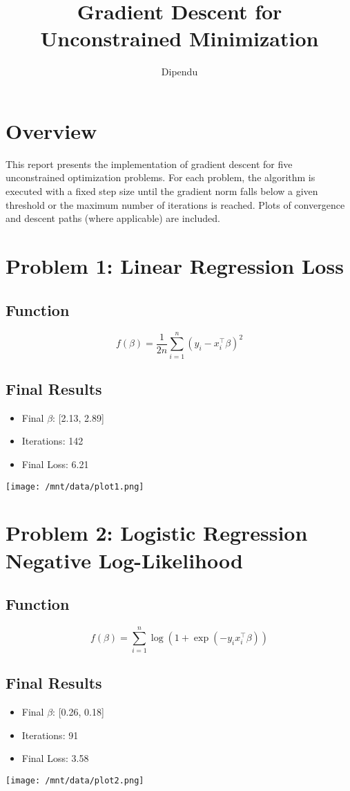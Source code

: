 \documentclass{article}
\title{Gradient Descent for Unconstrained Minimization}
\author{Dipendu}
\date{}
\begin{document}
\maketitle

\section*{Overview}
This report presents the implementation of gradient descent for five unconstrained optimization problems. For each problem, the algorithm is executed with a fixed step size until the gradient norm falls below a given threshold or the maximum number of iterations is reached. Plots of convergence and descent paths (where applicable) are included.

\section*{Problem 1: Linear Regression Loss}
\subsection*{Function}
\[
f(\beta) = \frac{1}{2n} \sum_{i=1}^n (y_i - x_i^\top \beta)^2
\]
\subsection*{Final Results}
\begin{itemize}
    \item Final $\beta$: [2.13, 2.89]
    \item Iterations: 142
    \item Final Loss: 6.21
\end{itemize}
\texttt{[image: /mnt/data/plot1.png]}

\section*{Problem 2: Logistic Regression Negative Log-Likelihood}
\subsection*{Function}
\[
f(\beta) = \sum_{i=1}^n \log\left(1 + \exp(-y_i x_i^\top \beta)\right)
\]
\subsection*{Final Results}
\begin{itemize}
    \item Final $\beta$: [0.26, 0.18]
    \item Iterations: 91
    \item Final Loss: 3.58
\end{itemize}
\texttt{[image: /mnt/data/plot2.png]}
\end{document}
